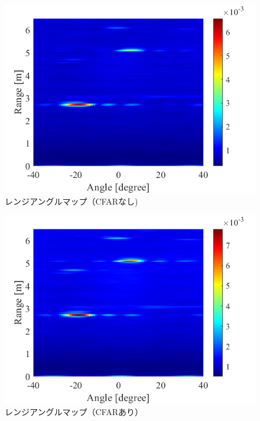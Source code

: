 \documentclass[dvipdfmx]{jsarticle}
\begin{document}
\begin{figure}[htbp]
\begin{center}
\includegraphics[width=0.8\linewidth]{./img/range_doppler_sample.png}
\end{center}
\caption{レンジアングルマップ（CFARなし)}
\end{figure}


\begin{figure}[H]
\begin{center}
\includegraphics[width=0.8\linewidth]{./img/cfar1.png}
\end{center}
\caption{レンジアングルマップ（CFARあり）}
\end{figure}
\end{document}
